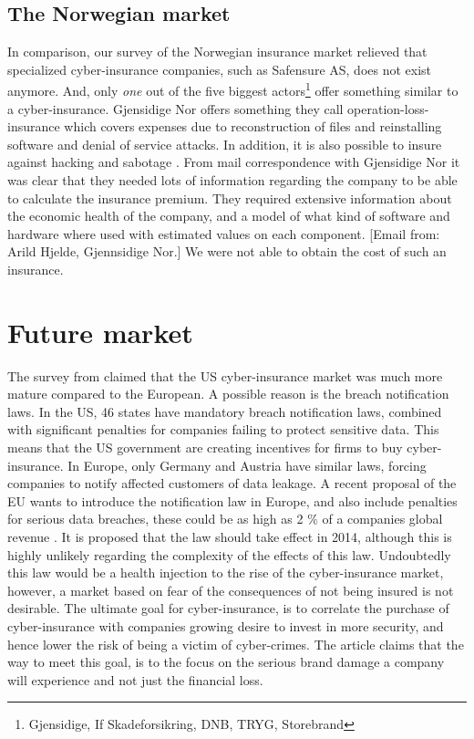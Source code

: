 \subsection{The Norwegian market}

In comparison, our survey of the Norwegian insurance market relieved that specialized cyber-insurance companies, such as Safensure AS, does not exist anymore. And, only \textit{one} out of the five biggest actors\footnote{Gjensidige, If Skadeforsikring, DNB, TRYG, Storebrand} offer something similar to a cyber-insurance. Gjensidige Nor offers something they call operation-loss-insurance which covers expenses due to reconstruction of files and reinstalling software and denial of service attacks. In addition, it is also possible to insure against hacking and sabotage \citep{gjensidige}. From mail correspondence with Gjensidige Nor it was clear that they needed lots of information regarding the company to be able to calculate the insurance premium. They required extensive information about the economic health of the company, and a model of what kind of software and hardware where used with estimated values on each component. [Email from: Arild Hjelde, Gjennsidige Nor.] We were not able to obtain the cost of such an insurance.
  

\section{Future market}
The survey from \cite{CFCunder} claimed that the US cyber-insurance market was much more mature compared to the European. A possible reason is the breach notification laws. In the US, 46 states have mandatory breach notification laws, combined with significant penalties for companies failing to protect sensitive data. This means that the US government are creating incentives for firms to buy cyber-insurance.
 In Europe, only Germany and Austria have similar laws, forcing companies to notify affected customers of data leakage. A recent proposal of the EU wants to introduce the notification law in Europe, and also include penalties for serious data breaches, these could be as high as 2 $\%$ of a companies global revenue \cite{CFCunder}. It is proposed that the law should take effect in 2014, although this is highly unlikely regarding the complexity of the effects of this law. Undoubtedly this law would be a health injection to the rise of the cyber-insurance market, however, a market based on fear of the consequences of not being insured is not desirable. The ultimate goal for cyber-insurance, is to correlate the purchase of cyber-insurance with companies growing desire to invest in more security, and hence lower the risk of being a victim of cyber-crimes. 
The article claims that the way to meet this goal, is to the focus on the serious brand damage a company will experience and not just the financial loss. 

